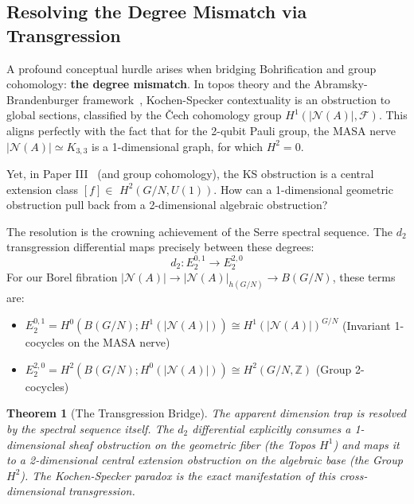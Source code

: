 \documentclass[11pt]{article}
\newtheorem{theorem}{Theorem}[section]
\begin{document}
\subsection{Resolving the Degree Mismatch via Transgression}
\label{degree-mismatch}

A profound conceptual hurdle arises when bridging Bohrification and group cohomology: \textbf{the degree mismatch}.
In topos theory and the Abramsky-Brandenburger framework~\cite{Abramsky2011}, Kochen-Specker contextuality is an obstruction to global sections, classified by the \v{C}ech cohomology group \textbf{$H^1(|\mathcal{N}(A)|, \mathcal{F})$}. This aligns perfectly with the fact that for the 2-qubit Pauli group, the MASA nerve $|\mathcal{N}(A)| \simeq K_{3,3}$ is a 1-dimensional graph, for which $H^2 = 0$.

Yet, in Paper III~\cite{PaperIII} (and group cohomology), the KS obstruction is a central extension class $[f] \in$ \textbf{$H^2(G/N, U(1))$}. 
How can a 1-dimensional geometric obstruction pull back from a 2-dimensional algebraic obstruction?

The resolution is the crowning achievement of the Serre spectral sequence. The $d_2$ transgression differential maps precisely between these degrees:
\[
d_2: E_2^{0,1} \longrightarrow E_2^{2,0}
\]
For our Borel fibration $|\mathcal{N}(A)| \to |\mathcal{N}(A)|_{h(G/N)} \to B(G/N)$, these terms are:
\begin{itemize}
\item $E_2^{0,1} = H^0(B(G/N); H^1(|\mathcal{N}(A)|)) \cong H^1(|\mathcal{N}(A)|)^{G/N}$ (Invariant 1-cocycles on the MASA nerve)
\item $E_2^{2,0} = H^2(B(G/N); H^0(|\mathcal{N}(A)|)) \cong H^2(G/N, \mathbb{Z})$ (Group 2-cocycles)
\end{itemize}

\begin{theorem}[The Transgression Bridge]\label{thm:transgression-bridge}
The apparent dimension trap is resolved by the spectral sequence itself. The $d_2$ differential explicitly consumes a 1-dimensional sheaf obstruction on the geometric fiber (the Topos $H^1$) and maps it to a 2-dimensional central extension obstruction on the algebraic base (the Group $H^2$). The Kochen-Specker paradox is the exact manifestation of this cross-dimensional transgression.
\end{theorem}
\end{document}
